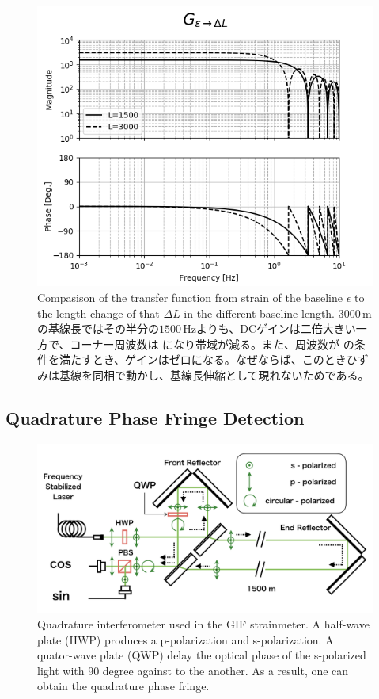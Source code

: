 \begin{figure}[p]
  \begin{center}
    \includegraphics[width=13.0cm]{./img_chap4/img412.png}
    \caption{Compasison of the transfer function from strain of the baseline $\epsilon$ to the length change of that $\Delta{L}$ in the different baseline length. $3000\,\mathrm{m}$ の基線長ではその半分の$1500\,\mathrm{Hz}$よりも、DCゲインは二倍大きい一方で、コーナー周波数は \color{red}{A} になり帯域が減る。また、周波数が \color{red}{B} の条件を満たすとき、ゲインはゼロになる。なぜならば、このときひずみは基線を同相で動かし、基線長伸縮として現れないためである。}\label{img:img411_a}
  \end{center}
\end{figure}



\subsection{Quadrature Phase Fringe Detection}
\begin{figure}[p]
  \begin{center}
    \includegraphics[width=13.0cm]{./img_chap4/img413.png}
    \caption{Quadrature interferometer used in the GIF strainmeter. A half-wave plate (HWP) produces a p-polarization and s-polarization. A quator-wave plate (QWP) delay the optical phase of the s-polarized light with 90 degree against to the another. As a result, one can obtain the quadrature phase fringe.}\label{img:img413}
  \end{center}
\end{figure}

